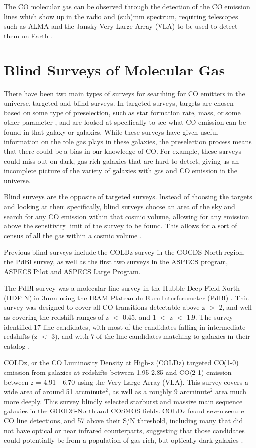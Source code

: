 \documentclass[twoside,single]{lion-msc}
\begin{document}
The CO molecular gas can be observed through the detection of the CO emission lines which show up in the radio and (sub)mm spectrum, requiring telescopes such as ALMA and the Jansky Very Large Array (VLA) to be used to detect them on Earth \cite{decarli2019alma}. 

\section{Blind Surveys of Molecular Gas}

There have been two main types of surveys for searching for CO emitters in the universe, targeted and blind surveys. In targeted surveys, targets are chosen based on some type of preselection, such as star formation rate, mass, or some other parameter \cite{tacconi2018phibss}, and are looked at specifically to see what CO emission can be found in that galaxy or galaxies. While these surveys have given useful information on the role gas plays in these galaxies, the preselection process means that there could be a bias in our knowledge of CO. For example, these surveys could miss out on dark, gas-rich galaxies that are hard to detect, giving us an incomplete picture of the variety of galaxies with gas and CO emission in the universe. 

Blind surveys are the opposite of targeted surveys. Instead of choosing the targets and looking at them specifically, blind surveys choose an area of the sky and search for any CO emission within that cosmic volume, allowing for any emission above the sensitivity limit of the survey to be found. This allows for a sort of census of all the gas within a cosmic volume \cite{decarli2019alma}. 

Previous blind surveys include the COLDz survey in the GOODS-North region, the PdBI survey, as well as the first two surveys in the ASPECS program, ASPECS Pilot and ASPECS Large Program.

The PdBI survey was a molecular line survey in the Hubble Deep Field North (HDF-N) in 3mm using the IRAM Plateau de Bure Interferometer (PdBI) \cite{decarli2014molecular}. This survey was designed to cover all CO transitions detectable above z $>$ 2, and well as covering the redshift ranges of z $<$ 0.45, and 1 $<$ z $<$ 1.9. The survey identified 17 line candidates, with most of the candidates falling in intermediate redshifts (z $<$ 3), and with 7 of the line candidates matching to galaxies in their catalog \cite{decarli2014molecular}.

COLDz, or the CO Luminosity Density at High-z (COLDz) targeted CO(1-0) emission from galaxies at redshifts between 1.95-2.85 and CO(2-1) emission between z = 4.91 - 6.70 using the Very Large Array (VLA)\cite{pavesi2018co}. This survey covers a wide area of around 51 arcminute$^2$, as well as a roughly 9 arcminute$^2$ area much more deeply. This survey blindly selected starburst and massive main sequence galaxies in the GOODS-North and COSMOS fields. COLDz found seven secure CO line detections, and 57 above their S/N threshold, including many that did not have optical or near infrared counterparts, suggesting that those candidates could potentially be from a population of gas-rich, but optically dark galaxies \cite{pavesi2018co}.
\end{document}
